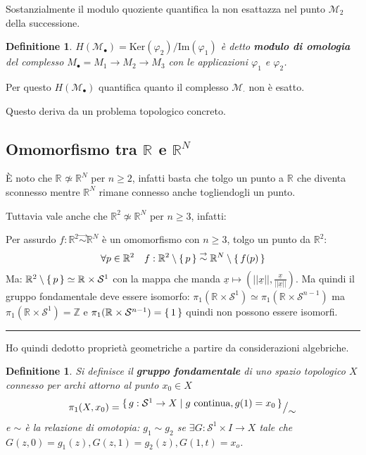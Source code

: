 \documentclass{article}
\newtheorem{definition}[theorem]{Definitione}
\newenvironment{proof}{{\bf Dimostrazione:}}{\hfill\rule{2mm}{2mm}}
\newcommand{\M}{\mathcal{M}}
\newcommand{\Z}{\mathbb{Z}}
\newcommand{\im}{\mathrm{Im}}
\renewcommand{\ker}{\mathrm{Ker}}
\renewcommand{\phi}{\varphi}
\newcommand{\RN}[1][]{\mathbb{R}^#1}
\newcommand*\quot[2]{{^{\textstyle #1}\big/_{\textstyle #2}}}
\begin{document}
Sostanzialmente il modulo quoziente quantifica la non esattazza nel punto $ \M_2 $
della successione.

\begin{definition}
  $ H(\M_\bullet) = {\ker (\phi_2)} \slash {\im (\phi_1)} $ è detto \textbf{modulo di omologia}
  del complesso $ M_\bullet = M_1 \longrightarrow M_2 \longrightarrow M_3 $ con le applicazioni $ \phi_1 $ e $ \phi_2 $.
\end{definition}
Per questo  $ H(\M_\bullet) $ quantifica quanto il complesso $ \M_\cdot $ non è esatto.

Questo deriva da un problema topologico concreto.

\subsection{Omomorfismo tra $ \RN{} $ e $ \RN{N} $}
È noto che $ \RN{} \not \simeq \RN{N} $ per $ n \geq 2 $, infatti basta
che tolgo un punto a $ \RN{} $ che diventa sconnesso mentre $ \RN{N} $
rimane connesso anche togliendogli un punto.

Tuttavia vale anche che $ \RN{2} \not \simeq \RN{N} $ per $ n \geq 3 $, infatti:

\begin{proof}
  Per assurdo $ f : \RN{2} \overset{\to}{\sim} \RN{N} $ è un omomorfismo con
  $ n \geq 3 $, tolgo un punto da $ \RN{2} $:
  \[
    \forall p \in \RN{2} \quad f:\RN{2} \setminus \set{p} \overset{\to}{\sim} \RN{N} \setminus \set{f(p)}
  \]
  Ma: $ \RN{2} \setminus \set{p} \simeq \RN{} \times \mathcal{S}^1 $ con la mappa
  che manda $ \underline{x} \mapsto \left( || \underline{x} ||, \frac{\underline{x}}{|| \underline{x} ||} \right) $. Ma quindi il gruppo fondamentale deve essere isomorfo:
  $ \pi_1 (\RN{} \times \mathcal{S}^{1}) \simeq \pi_1(\RN{}\times \mathcal{S}^{n-1}) $ ma $ \pi_1 (\RN{}\times \mathcal{S}^{1}) = \Z $ e $ \pi_1(\RN{}\times \mathcal{S}^{n-1}) = \set{1} $ quindi non possono essere isomorfi.
\end{proof}
Ho quindi dedotto proprietà geometriche a partire da considerazioni algebriche.

\begin{definition}
  Si definisce il \textbf{gruppo fondamentale} di uno spazio topologico $ X $
  connesso per archi attorno al punto $ x_0 \in X $
  \[
    \pi_1 (X, x_0) = \quot{\set{ g: \mathcal{S}^1 \to X | g \text{ continua}, g(1) = x_0}}{\sim}
  \]
  e $ \sim $ è la relazione di omotopia: $ g_1 \sim g_2 $ se $ \exists G: \mathcal{S}^1 \times I \to X  $ tale che
  $ G(z,0) = g_1(z), G(z,1) = g_2(z), G(1,t) = x_o $.
\end{definition}
\end{document}

